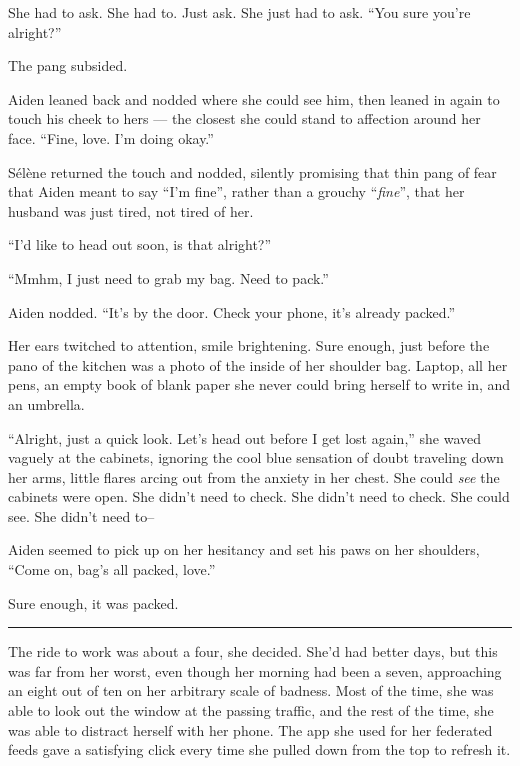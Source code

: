 She had to ask. She had to. Just ask. She just had to ask. ``You sure you're alright?''

The pang subsided.

Aiden leaned back and nodded where she could see him, then leaned in again to touch his cheek to hers --- the closest she could stand to affection around her face. ``Fine, love. I'm doing okay.''

Sélène returned the touch and nodded, silently promising that thin pang of fear that Aiden meant to say ``I'm fine'', rather than a grouchy ``\emph{fine}'', that her husband was just tired, not tired of her.

``I'd like to head out soon, is that alright?''

``Mmhm, I just need to grab my bag. Need to pack.''

Aiden nodded. ``It's by the door. Check your phone, it's already packed.''

Her ears twitched to attention, smile brightening. Sure enough, just before the pano of the kitchen was a photo of the inside of her shoulder bag. Laptop, all her pens, an empty book of blank paper she never could bring herself to write in, and an umbrella.

``Alright, just a quick look. Let's head out before I get lost again,'' she waved vaguely at the cabinets, ignoring the cool blue sensation of doubt traveling down her arms, little flares arcing out from the anxiety in her chest. She could \emph{see} the cabinets were open. She didn't need to check. She didn't need to check. She could see. She didn't need to--

Aiden seemed to pick up on her hesitancy and set his paws on her shoulders, ``Come on, bag's all packed, love.''

Sure enough, it was packed.

\begin{center}\rule{0.5\linewidth}{\linethickness}\end{center}

The ride to work was about a four, she decided. She'd had better days, but this was far from her worst, even though her morning had been a seven, approaching an eight out of ten on her arbitrary scale of badness. Most of the time, she was able to look out the window at the passing traffic, and the rest of the time, she was able to distract herself with her phone. The app she used for her federated feeds gave a satisfying click every time she pulled down from the top to refresh it.

